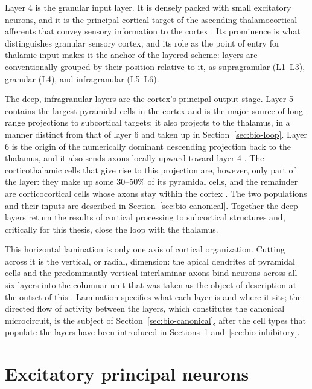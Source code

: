 Layer 4 is the granular input layer. It is densely packed with small excitatory neurons, and it is the principal cortical target of the 
ascending thalamocortical afferents that convey sensory information to the cortex \parencite{white1989, douglas2004}. Its prominence is 
what distinguishes granular sensory cortex, and its role as the point of entry for thalamic input makes it the anchor of the layered 
scheme: layers are conventionally grouped by their position relative to it, as supragranular (L1--L3), granular (L4), and infragranular 
(L5--L6).

The deep, infragranular layers are the cortex's principal output stage. Layer 5 contains the largest pyramidal cells in the cortex and 
is the major source of long-range projections to subcortical targets; it also projects to the thalamus, in a manner distinct from that 
of layer 6 and taken up in Section~\ref{sec:bio-loop}. Layer 6 is the origin of the numerically dominant descending projection back to the thalamus, and it also sends axons locally upward toward layer 4 \parencite{shepherd2018, sherman1998}. The corticothalamic cells that give rise to this projection are, however, only part of the layer: they make up some 30--50\% of its pyramidal cells, and the remainder are corticocortical cells whose axons stay within the cortex \parencite{thomson2010layer6}. The two populations and their inputs are described in Section~\ref{sec:bio-canonical}. Together the deep layers return the results of cortical processing to subcortical structures 
and, critically for this thesis, close the loop with the thalamus.

This horizontal lamination is only one axis of cortical organization. Cutting across it is the vertical, or radial, dimension: the 
apical dendrites of pyramidal cells and the predominantly vertical interlaminar axons bind neurons across all six layers into the 
columnar unit that was taken as the object of description at the outset of this \unitname{}. Lamination specifies what each layer is and where 
it sits; the directed flow of activity between the layers, which constitutes the canonical microcircuit, is the subject of Section~\ref{sec:bio-canonical}, 
after the cell types that populate the layers have been introduced in Sections~\ref{sec:bio-excitatory} and~\ref{sec:bio-inhibitory}.

\section{Excitatory principal neurons}
\label{sec:bio-excitatory}

